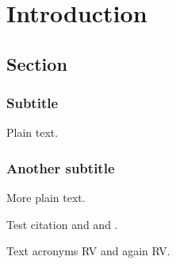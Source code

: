 
\chapter{Introduction}

\section{Section}

\subsection{Subtitle}

Plain text.

\subsection{Another subtitle}

More plain text.

Test citation \cite{APRES08} and \cite{DATE08} and \cite{JTRES09}.

Text acronyms \ac{RV} and again \ac{RV}.